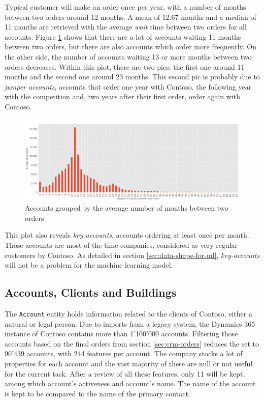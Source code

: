 Typical customer will make an order once per year, with a number of months between two orders around 12 months, A mean of 12.67 months and a median of 11 months are retrieved with the average \textit{wait} time between two orders for all accounts. Figure \ref{fig:orders-account-counts} shows that there are a lot of accounts waiting 11 months between two orders, but there are also accounts which order more frequently. On the other side, the number of accounts waiting 13 or more months between two orders decreases. Within this plot, there are two pics: the first one around 11 months and the second one around 23 months. This second pic is probably due to \textit{jumper accounts}, accounts that order one year with Contoso, the following year with the competition and, two years after their first order, order again with Contoso. 

\begin{figure}[h]
    \centering
    \includegraphics[width=15cm]{images/accounts-average-time-orders.png}
    \caption[Average number of months between two orders]{Accounts grouped by the average number of months between two orders}
    \label{fig:orders-account-counts}
\end{figure}

This plot also reveals \textit{key-accounts}, accounts ordering at least once per month. Those accounts are most of the time companies, considered as very regular customers by Contoso. As detailed in section \ref{sec:data-shape-for-ml}, \textit{key-accounts} will not be a problem for the machine learning model.


\subsection{Accounts, Clients and Buildings}\label{sec:crm-accounts}
The \texttt{Account} entity holds information related to the clients of Contoso, either a natural or legal person. Due to imports from a legacy system, the Dynamics 365 instance of Contoso contains more than 1'100'000 accounts. Filtering those accounts based on the final orders from section \ref{sec:crm-orders} reduces the set to 90'439 accounts, with 244 features per account. The company stocks a lot of properties for each account and the vast majority of these are null or not useful for the current task. After a review of all these features, only 11 will be kept, among which account's activeness and account's name. The name of the account is kept to be compared to the name of the primary contact.

